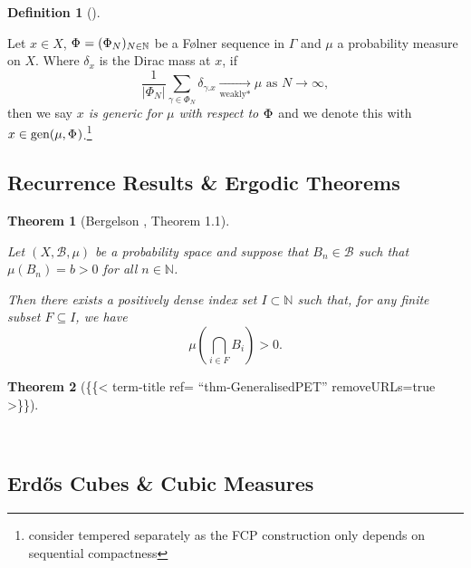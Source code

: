 \documentclass[
  british,
]{article}
\theoremstyle{definition}
\newtheorem{definition}{Definition}[section]
\theoremstyle{plain}
\theoremstyle{plain}
\newtheorem{theorem}{Theorem}[section]
\theoremstyle{remark}
\newcommand{\Measure}{{\mu}}
\newcommand{\GroupElement}{{\gamma}}
\newcommand{\Folner}[1][\vphantom{}]{{\Phi}_{#1}}
\newcommand{\GroupAction}[2]{{#1}.{#2}}
\newcommand{\SigmaAlgebra}[1]{{\mathscr{#1}}}
\begin{document}
\begin{definition}[]\protect\hypertarget{def-GenericDef}{}\label{def-GenericDef}

Let \(x\in X\), \(\Folner=(\Folner[N])_{N\in\mathbb{N}}\) be a Følner
sequence in \(\Gamma\) and \(\Measure\) a probability measure on \(X\).
Where \(\delta_x\) is the Dirac mass at \(x\), if
\[\frac{1}{|\Folner[N]|}\sum_{\GroupElement\in\Folner[N]}\delta_{\GroupAction{\GroupElement}{x}}\underset{\text{weakly*}}{\longrightarrow} \Measure \text{ as }N\rightarrow\infty, \]
then we say \emph{\(x\) is generic for \(\Measure\) with respect to
\(\Folner\)} and we denote this with
\(x\in\text{gen}(\Measure,\Folner)\).\footnote{consider tempered
  separately as the FCP construction only depends on sequential
  compactness}

\end{definition}

\subsection{Recurrence Results \& Ergodic
Theorems}\label{recurrence-results-ergodic-theorems}

\begin{theorem}[Bergelson
, Theorem
1.1]\protect\hypertarget{thm-BergelsonRecurrence}{}\label{thm-BergelsonRecurrence}

Let \((X,\SigmaAlgebra{B},\Measure)\) be a probability space and suppose
that \(B_n\in\SigmaAlgebra{B}\) such that \(\Measure(B_n)=b>0\) for all
\(n\in\mathbb{N}\).

Then there exists a positively dense index set \(I\subset\mathbb{N}\)
such that, for any finite subset \(F\subseteq I\), we have
\[\Measure\left(\bigcap_{i\in F}B_i \right)>0. \]

\end{theorem}

\begin{theorem}[\{\{\textless{} term-title ref= ``thm-GeneralisedPET''
removeURLs=true
\textgreater\}\}]\protect\hypertarget{thm-GeneralisedPET}{}\label{thm-GeneralisedPET}

~

\end{theorem}

\subsection{Erdős Cubes \& Cubic
Measures}\label{erdux151s-cubes-cubic-measures}
\end{document}
